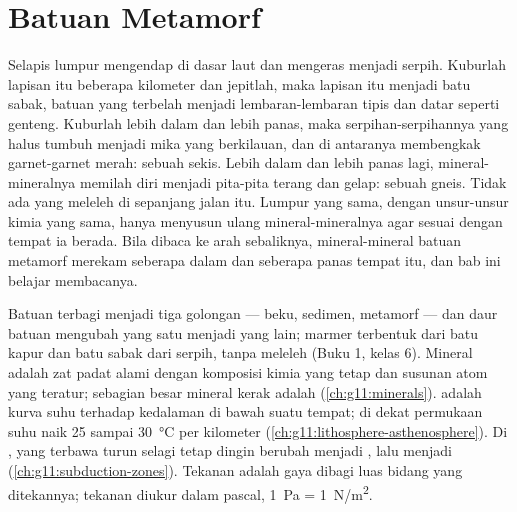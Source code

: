 \chapter{Batuan Metamorf}\label{ch:g12:metamorphic-rocks}

Selapis lumpur mengendap di dasar laut dan mengeras menjadi serpih. Kuburlah
lapisan itu beberapa kilometer dan jepitlah, maka lapisan itu menjadi batu
sabak, batuan yang terbelah menjadi lembaran-lembaran tipis dan datar seperti
genteng. Kuburlah lebih dalam dan lebih panas, maka serpihan-serpihannya yang
halus tumbuh menjadi mika yang berkilauan, dan di antaranya membengkak
garnet-garnet merah: sebuah sekis. Lebih dalam dan lebih panas lagi,
mineral-mineralnya memilah diri menjadi pita-pita terang dan gelap: sebuah
gneis. Tidak ada yang meleleh di sepanjang jalan itu. Lumpur yang sama, dengan
unsur-unsur kimia yang sama, hanya menyusun ulang mineral-mineralnya agar sesuai
dengan tempat ia berada. Bila dibaca ke arah sebaliknya, mineral-mineral batuan
metamorf merekam seberapa dalam dan seberapa panas tempat itu, dan bab ini
belajar membacanya.

\begin{recall}
Batuan terbagi menjadi tiga golongan --- beku, sedimen, metamorf --- dan
daur batuan mengubah yang satu menjadi yang lain; marmer terbentuk dari batu
kapur dan batu sabak dari serpih, tanpa meleleh (Buku 1, kelas 6). Mineral
adalah zat padat alami dengan komposisi kimia yang tetap dan susunan atom yang
teratur; sebagian besar mineral kerak adalah 
(\cref{ch:g11:minerals}).  adalah kurva suhu terhadap kedalaman di bawah
suatu tempat; di dekat permukaan suhu naik 25 sampai \qty{30}{\celsius} per
kilometer (\cref{ch:g11:lithosphere-asthenosphere}). Di ,  yang terbawa turun selagi tetap dingin berubah menjadi , lalu
menjadi  (\cref{ch:g11:subduction-zones}). Tekanan adalah gaya dibagi
luas bidang yang ditekannya; tekanan diukur dalam pascal, \qty{1}{Pa} =
\qty{1}{N/m^2}.
\end{recall}

